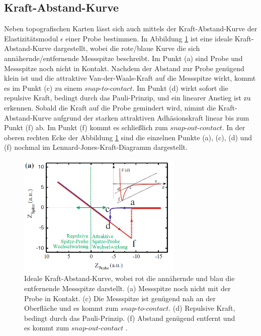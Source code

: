 \subsection{Kraft-Abstand-Kurve}
\label{sec:Kraft-Abstand}

Neben topografischen Karten lässt sich auch mittels der Kraft-Abstand-Kurve der
Elastizitätsmodul $\epsilon$ einer Probe bestimmen. In Abbildung \ref{fig:Kraft-Abstand}
ist eine ideale Kraft-Abstand-Kurve dargestellt, wobei die rote/blaue Kurve die
sich annähernde/entfernende Messspitze beschreibt. Im Punkt (a) sind Probe und
Messspitze noch nicht in Kontakt. Nachdem der Abstand zur Probe genügend klein
ist und die attraktive Van-der-Waals-Kraft auf die Messspitze wirkt, kommt es im
Punkt (c) zu einem $\textit{snap-to-contact}$. Im Punkt (d) wirkt sofort die repulsive
Kraft, bedingt durch das Pauli-Prinzip, und ein linearer Anstieg ist zu erkennen.
Sobald die Kraft auf die Probe gemindert wird, nimmt die Kraft-Abstand-Kurve
aufgrund der starken attraktiven Adhäsionskraft linear bis zum Punkt (f) ab.
Im Punkt (f) kommt es schließlich zum $\textit{snap-out-contact}$. In der oberen
rechten Ecke der Abbildung \ref{fig:Kraft-Abstand} sind die einzelnen Punkte (a),
(c), (d) und (f) nochmal im Lennard-Jones-Kraft-Diagramm dargestellt.

\begin{figure}[H]
	\centering
	\includegraphics[width=0.7\textwidth]{Abb/Kraft-Abstand-Kurve.png}
	\caption{Ideale Kraft-Abstand-Kurve, wobei rot die annähernde und blau die
	entfernende Messspitze darstellt. (a) Messspitze noch nicht mit der Probe in
	Kontakt. (c) Die Messspitze ist genügend nah an der Oberfläche und es kommt zum
$\textit{snap-to-contact}$. (d) Repulsive Kraft, bedingt durch das Pauli-Prinzip.
	(f) Abstand genügend entfernt und es kommt zum $\textit{snap-out-contact}$
	\cite[184]{AFM}.}
	\label{fig:Kraft-Abstand}
\end{figure}
